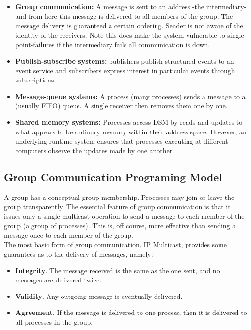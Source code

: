\begin{itemize}
\item \textbf{Group communication:} A message is sent to an address -the intermediary-  and from here this message is delivered to all members of the group. The message delivery is guaranteed a certain ordering. Sender is not aware of the identity of the receivers. Note this does make the system vulnerable to single-point-failures if the intermediary fails all communication is down. \\

\item \textbf{Publish-subscribe systems:} publishers publish structured events to an event service and subscribers express interest in particular events through  subscriptions. \\

\item \textbf{Message-queue systems:} A process (many processes) sends a message to a (usually FIFO) queue. A single receiver then removes them one by one.\\

\item \textbf{Shared memory systems:} Processes access DSM by reads and updates to what appears to be ordinary memory within their address space. However, an underlying runtime system ensures that processes executing at different computers observe the updates made by one another.\\
\end{itemize}

\subsection{Group Communication Programing Model}

A group has a conceptual group-membership. Processes may join or leave the group transparently. The essential feature of group communication is that it issues only a single multicast operation to send a message to each member of the group (a group of processes). This is, off course, more effective than sending a message once to each member of the group. \\

The most basic form of group communication, IP Multicast, provides some guarantees as to the delivery of messages, namely:\\

\begin{itemize}
\item \textbf{Integrity}. The message received is the same as the one sent, and no messages are delivered twice. 
\item \textbf{Validity}. Any outgoing  message is eventually delivered.
\item \textbf{Agreement}. If the message is delivered to one process, then it is delivered to all processes in the group.
\end{itemize}

